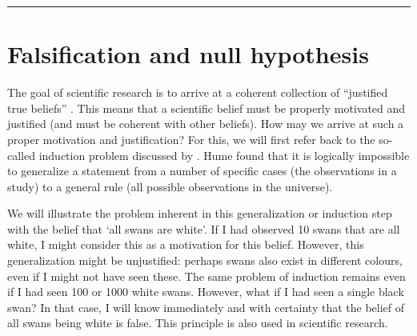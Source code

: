 \documentclass[
]{book}
\begin{document}
\begin{center}\rule{0.5\linewidth}{0.5pt}\end{center}

\section{Falsification and null hypothesis}\label{sec:falsification}

The goal of scientific research is to arrive at a coherent collection of ``justified true beliefs'' \citep{Mort03}. This means that a scientific belief must be properly motivated and justified (and must be coherent with other beliefs). How may we arrive at such a proper motivation and justification? For this, we will first refer back to the so-called induction problem discussed by \citet{Hume1739}. Hume found that it is logically impossible to generalize a statement from a number of specific cases (the observations in a study) to a general rule (all possible observations in the universe).

We will illustrate the problem inherent in this generalization or induction step with the belief that `all swans are white'. If I had observed 10 swans that are all white, I might consider this as a motivation for this belief. However, this generalization might be unjustified: perhaps swans also exist in different colours, even if I might not have seen these. The same problem of induction remains even if I had seen 100 or 1000 white swans. However, what if I had seen a single black swan? In that case, I will know immediately and with certainty that the belief of all swans being white is false. This principle is also used in scientific research.
\end{document}
